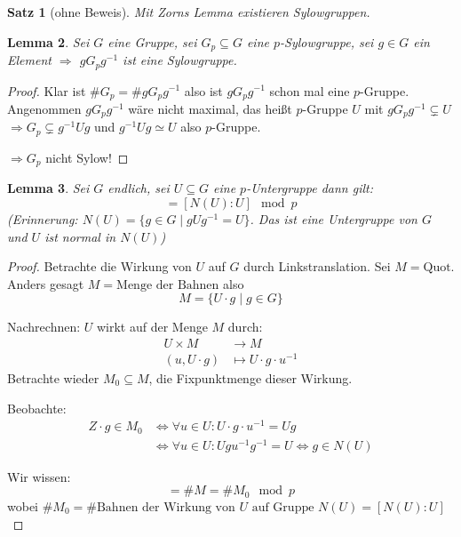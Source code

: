 \documentclass[a4paper,12pt,numbers=noenddot,parskip=full]{scrartcl}
\theoremstyle{dotless}
\newtheorem{theorem}{Satz}[section]
\newtheorem{lemma}[theorem]{Lemma}
\theoremstyle{remark}
\begin{document}
	\begin{theorem}[ohne Beweis]
		Mit Zorns Lemma existieren Sylowgruppen.
	\end{theorem}

	\begin{lemma}
		Sei $G$ eine Gruppe, sei $G_p \subseteq G$ eine $p$-Sylowgruppe, sei $g \in G$ ein Element $\Rightarrow$ $g G_p g^{-1}$ ist eine Sylowgruppe.
	\end{lemma}

	\begin{proof}
		Klar ist $\#G_p = \# g G_p g^{-1}$ also ist $g G_p g^{-1}$ schon mal eine $p$-Gruppe.
		Angenommen $g G_p g^{-1}$ wäre nicht maximal, das heißt $p$-Gruppe $U$ mit $g G_p g^{-1} \subsetneq U$ $\Rightarrow G_p \subsetneq g^{-1} U g$ und $g^{-1} U g \simeq U$ also $p$-Gruppe.
		
		$\Rightarrow G_p$ nicht Sylow!
	\end{proof}

	\begin{lemma}
		Sei $G$ endlich, sei $U \subseteq G$ eine $p$-Untergruppe dann gilt:
		\begin{equation*}
			[G:U] = [N(U): U] \mod p
		\end{equation*}
		(Erinnerung: $N(U) = \{ g \in G \mid g U g^{-1} = U \}$. Das ist eine Untergruppe von $G$ und $U$ ist normal in $N(U)$)
	\end{lemma}
	
	\begin{proof}
		Betrachte die Wirkung von $U$ auf $G$ durch Linkstranslation. Sei $M = \text{Quot}$. Anders gesagt $M = \text{Menge der Bahnen}$ also
		\begin{equation*}
			M = \{ U \cdot g \mid g \in G \}
		\end{equation*}
		
		Nachrechnen: $U$ wirkt auf der Menge $M$ durch:
		\begin{align*}
			U \times M &\longrightarrow M \\
			(u, U \cdot g) &\longmapsto U \cdot g \cdot u^{-1}
		\end{align*}
		Betrachte wieder $M_0 \subseteq M$, die Fixpunktmenge dieser Wirkung.
		
		Beobachte: 
		\begin{align*}
			Z \cdot g \in M_0 &\Leftrightarrow \forall u \in U: U \cdot g \cdot u^{-1} = U g \\
			&\Leftrightarrow \forall u \in U: U g u^{-1} g^{-1} = U \Leftrightarrow g \in N(U)
		\end{align*}
		
		Wir wissen:
		\begin{equation*}
			[G:U] = \#M = \# M_0 \mod p
		\end{equation*}
		wobei $\#M_0 = \#\text{Bahnen der Wirkung von $U$ auf Gruppe $N(U)$} = [N(U):U]$
	\end{proof}
\end{document}
